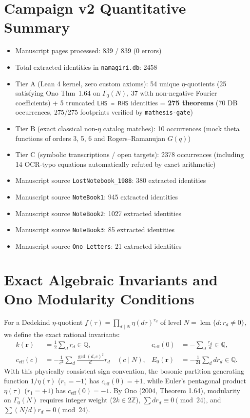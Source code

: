 \documentclass[11pt,twoside,openright]{book}
\begin{document}
\chapter{Campaign v2 Quantitative Summary}
\begin{itemize}
  \item Manuscript pages processed: 839 / 839 (0 errors)
  \item Total extracted identities in \texttt{namagiri.db}: 2458
  \item Tier A (Lean 4 kernel, zero custom axioms): 54 unique $\eta$-quotients (25 satisfying Ono Thm~1.64 on $\Gamma_0(N)$, 37 with non-negative Fourier coefficients) + 5 truncated \texttt{LHS = RHS} identities = \textbf{275 theorems} (70 DB occurrences, 275/275 footprints verified by \texttt{mathesis-gate})
  \item Tier B (exact classical non-$\eta$ catalog matches): 10 occurrences (mock theta functions of orders 3, 5, 6 and Rogers--Ramanujan $G(q)$)
  \item Tier C (symbolic transcriptions / open targets): 2378 occurrences (including 14 OCR-typo equations automatically refuted by exact arithmetic)
  \item Manuscript source \texttt{LostNotebook\_1988}: 380 extracted identities
  \item Manuscript source \texttt{NoteBook1}: 945 extracted identities
  \item Manuscript source \texttt{NoteBook2}: 1027 extracted identities
  \item Manuscript source \texttt{NoteBook3}: 85 extracted identities
  \item Manuscript source \texttt{Ono\_Letters}: 21 extracted identities
\end{itemize}

\chapter{Exact Algebraic Invariants and Ono Modularity Conditions}
For a Dedekind $\eta$-quotient $f(\tau) = \prod_{d \mid N} \eta(d\tau)^{r_d}$ of level $N = \operatorname{lcm}\{d : r_d \neq 0\}$, we define the exact rational invariants:
\begin{align*}
  k(\mathbf{r}) &= \frac{1}{2} \sum_d r_d \in \mathbb{Q}, &
  c_{\text{eff}}(0) &= -\sum_d \frac{r_d}{d} \in \mathbb{Q}, \\
  c_{\text{eff}}(c) &= -\frac{1}{c^2} \sum_d \frac{\gcd(d, c)^2}{d} r_d \quad (c \mid N), &
  E_0(\mathbf{r}) &= -\frac{1}{24} \sum_d d r_d \in \mathbb{Q}.
\end{align*}
With this physically consistent sign convention, the bosonic partition generating function $1/\eta(\tau)$ ($r_1 = -1$) has $c_{\text{eff}}(0) = +1$, while Euler's pentagonal product $\eta(\tau)$ ($r_1 = +1$) has $c_{\text{eff}}(0) = -1$. By Ono (2004, Theorem 1.64), modularity on $\Gamma_0(N)$ requires integer weight ($2k \in 2\mathbb{Z}$), $\sum d r_d \equiv 0 \pmod{24}$, and $\sum (N/d) r_d \equiv 0 \pmod{24}$.
\end{document}
